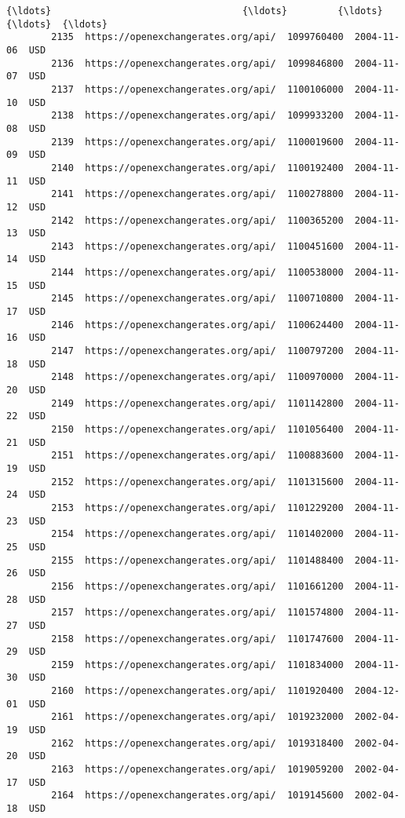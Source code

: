 \documentclass[11pt]{article}
\begin{document}
\begin{Verbatim}[commandchars=\\\{\}]
        {\ldots}                                  {\ldots}         {\ldots}         {\ldots}  {\ldots}   
        2135  https://openexchangerates.org/api/  1099760400  2004-11-06  USD   
        2136  https://openexchangerates.org/api/  1099846800  2004-11-07  USD   
        2137  https://openexchangerates.org/api/  1100106000  2004-11-10  USD   
        2138  https://openexchangerates.org/api/  1099933200  2004-11-08  USD   
        2139  https://openexchangerates.org/api/  1100019600  2004-11-09  USD   
        2140  https://openexchangerates.org/api/  1100192400  2004-11-11  USD   
        2141  https://openexchangerates.org/api/  1100278800  2004-11-12  USD   
        2142  https://openexchangerates.org/api/  1100365200  2004-11-13  USD   
        2143  https://openexchangerates.org/api/  1100451600  2004-11-14  USD   
        2144  https://openexchangerates.org/api/  1100538000  2004-11-15  USD   
        2145  https://openexchangerates.org/api/  1100710800  2004-11-17  USD   
        2146  https://openexchangerates.org/api/  1100624400  2004-11-16  USD   
        2147  https://openexchangerates.org/api/  1100797200  2004-11-18  USD   
        2148  https://openexchangerates.org/api/  1100970000  2004-11-20  USD   
        2149  https://openexchangerates.org/api/  1101142800  2004-11-22  USD   
        2150  https://openexchangerates.org/api/  1101056400  2004-11-21  USD   
        2151  https://openexchangerates.org/api/  1100883600  2004-11-19  USD   
        2152  https://openexchangerates.org/api/  1101315600  2004-11-24  USD   
        2153  https://openexchangerates.org/api/  1101229200  2004-11-23  USD   
        2154  https://openexchangerates.org/api/  1101402000  2004-11-25  USD   
        2155  https://openexchangerates.org/api/  1101488400  2004-11-26  USD   
        2156  https://openexchangerates.org/api/  1101661200  2004-11-28  USD   
        2157  https://openexchangerates.org/api/  1101574800  2004-11-27  USD   
        2158  https://openexchangerates.org/api/  1101747600  2004-11-29  USD   
        2159  https://openexchangerates.org/api/  1101834000  2004-11-30  USD   
        2160  https://openexchangerates.org/api/  1101920400  2004-12-01  USD   
        2161  https://openexchangerates.org/api/  1019232000  2002-04-19  USD   
        2162  https://openexchangerates.org/api/  1019318400  2002-04-20  USD   
        2163  https://openexchangerates.org/api/  1019059200  2002-04-17  USD   
        2164  https://openexchangerates.org/api/  1019145600  2002-04-18  USD   
        

\end{Verbatim}
\end{document}

